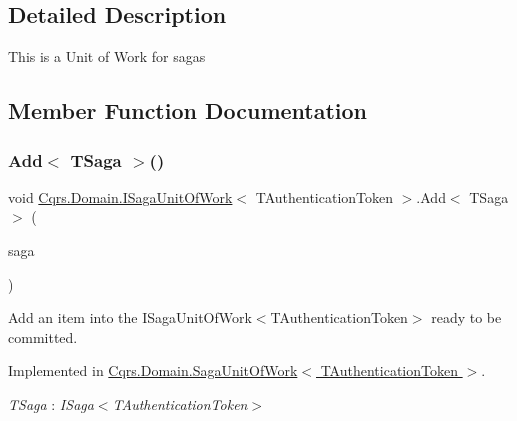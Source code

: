 \subsection{Detailed Description}
This is a Unit of Work for sagas 



\subsection{Member Function Documentation}
\mbox{\label{interfaceCqrs_1_1Domain_1_1ISagaUnitOfWork_a5e7c8e18a8d71fc915db48fac00e7da4_a5e7c8e18a8d71fc915db48fac00e7da4}} 
\subsubsection{\texorpdfstring{Add$<$ T\+Saga $>$()}{Add< TSaga >()}}
{\footnotesize\ttfamily void \hyperlink{interfaceCqrs_1_1Domain_1_1ISagaUnitOfWork}{Cqrs.\+Domain.\+I\+Saga\+Unit\+Of\+Work}$<$ T\+Authentication\+Token $>$.Add$<$ T\+Saga $>$ (\begin{DoxyParamCaption}\item[{T\+Saga}]{saga }\end{DoxyParamCaption})}



Add an item into the I\+Saga\+Unit\+Of\+Work$<$\+T\+Authentication\+Token$>$ ready to be committed. 



Implemented in \hyperlink{classCqrs_1_1Domain_1_1SagaUnitOfWork_af62fee98e76ec58ec4d684b36eb7b20e_af62fee98e76ec58ec4d684b36eb7b20e}{Cqrs.\+Domain.\+Saga\+Unit\+Of\+Work$<$ T\+Authentication\+Token $>$}.

\begin{Desc}
\item[Type Constraints]\begin{description}
\item[{\em T\+Saga} : {\em I\+Saga$<$T\+Authentication\+Token$>$}]\end{description}
\end{Desc}
\mbox{\label{interfaceCqrs_1_1Domain_1_1ISagaUnitOfWork_aaa8a63b5304c837deec8a0103eb702f7_aaa8a63b5304c837deec8a0103eb702f7}} 
